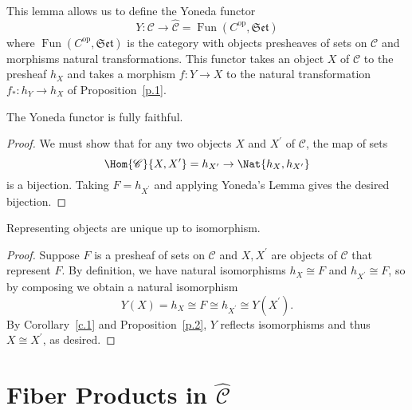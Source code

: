 \documentclass[10pt]{amsart}
\begin{document}
This lemma allows us to define the Yoneda functor
$$Y : \mathscr{C} \rightarrow \hat{\mathscr{C}} = \operatorname{Fun}(C^\text{op}, \mathfrak{Set})$$
where $\operatorname{Fun}(C^\text{op}, \mathfrak{Set})$ is the category with objects presheaves of sets on $\mathscr{C}$ and morphisms natural transformations.
This functor takes an object $X$ of $\mathscr{C}$ to the presheaf $h_X$ and takes a morphism $f : Y \rightarrow X$ to the natural transformation $f_* : h_Y \rightarrow h_X$ of Proposition~\ref{p.1}.

\begin{cor}\label{c.1}
  The Yoneda functor is fully faithful.

  \begin{proof}
    We must show that for any two objects $X$ and $X^\prime$ of $\mathscr{C}$, the map of sets
    $$\Hom{\mathscr{C}}{X,X^\prime} = h_{X^\prime} \rightarrow \Nat{h_X,h_{X^\prime}}$$
    is a bijection.
    Taking $F = h_{X^\prime}$ and applying Yoneda's Lemma gives the desired bijection.
  \end{proof}
\end{cor}

\begin{cor}
  Representing objects are unique up to isomorphism.

  \begin{proof}
    Suppose $F$ is a presheaf of sets on $\mathscr{C}$ and $X, X^\prime$ are objects of $\mathscr{C}$ that represent $F$.
    By definition, we have natural isomorphisms $h_X \cong F$ and $h_{X^\prime} \cong F$, so by composing we obtain a natural isomorphism
    $$Y(X) = h_X \cong F \cong h_{X^\prime} \cong Y(X^\prime).$$
    By Corollary~\ref{c.1} and Proposition~\ref{p.2}, $Y$ reflects isomorphisms and thus $X \cong X^\prime$, as desired.
  \end{proof}
\end{cor}

\section{Fiber Products in $\hat{\mathscr{C}}$}
\end{document}
